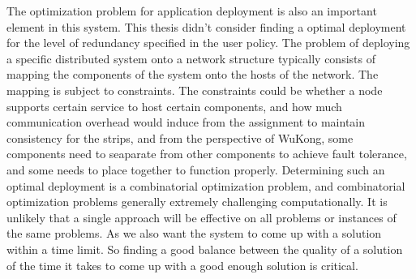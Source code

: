 The optimization problem for application deployment is also an important element
in this system. This thesis didn't consider finding a optimal deployment for the
level of redundancy specified in the user policy. The problem of deploying
a specific distributed system onto a network structure typically consists of
mapping the components of the system onto the hosts of the network. The mapping
is subject to constraints. The constraints could be whether a node supports
certain service to host certain components, and how much communication overhead
would induce from the assignment to maintain consistency for the strips, and
from the perspective of WuKong, some components need to seaparate from other
components to achieve fault tolerance, and some needs to place together to
function properly.  Determining such an optimal deployment is a combinatorial
optimization problem, and combinatorial optimization problems generally
extremely challenging computationally. It is unlikely that a single approach
will be effective on all problems or instances of the same problems. As we also
want the system to come up with a solution within a time limit. So finding
a good balance between the quality of a solution of the time it takes to come up
with a good enough solution is critical.
